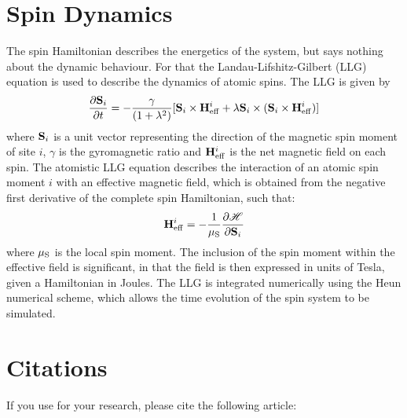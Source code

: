  \section*{Spin Dynamics}
The spin Hamiltonian describes the energetics of the system, but says nothing about the dynamic behaviour. For that the Landau-Lifshitz-Gilbert (LLG) equation is used to describe the dynamics of atomic spins. The LLG is given by
\begin{equation}\label{eqn:LLG}
\frac{\partial \sms_i }{\partial t} =
-\frac{\gamma}{(1+\lambda^{2})}[\sms_i \times
\smH^i_{\mathrm{eff}} + \lambda \sms_i \times
(\sms_i \times \smH^i_{\mathrm{eff}})]
\end{equation}
where $\mathbf{S}_i$ is a unit vector representing the direction of the magnetic spin moment of site $i$, $\gamma$ is the gyromagnetic ratio and $\mathbf{H}^i_{\mathrm{eff}}$ is the net magnetic field on each spin. The atomistic LLG equation describes the interaction of an atomic spin moment $i$ with an effective magnetic field, which is obtained from the negative first derivative of the complete spin Hamiltonian, such that:
\begin{equation}\label{eqn:Heff}
  \smH^i_{\mathrm{eff}} = -\frac{1}{\smmu}\frac{\partial \mathscr{H}}{\partial \sms_i}
\end{equation}
where $\mu_\mathrm{S}$ is the local spin moment. The inclusion of the spin moment within the effective field is significant, in that the field is then expressed in units of Tesla, given a Hamiltonian in Joules. The LLG is integrated numerically using the Heun numerical scheme, which allows the time evolution of the spin system to be simulated.



\section*{Citations}
If you use \vampire for your research, please cite the following article:\\


